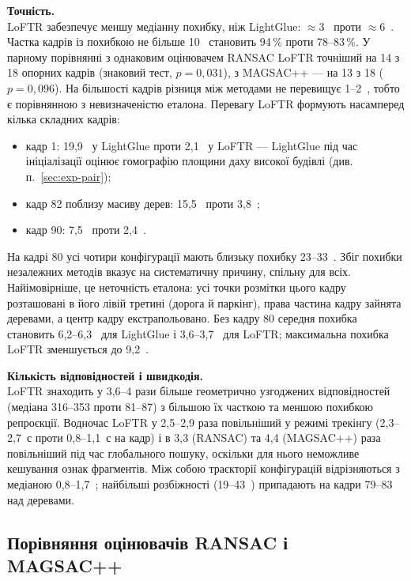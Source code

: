\documentclass[a4paper, 12pt, titlepage]{article}
\begin{document}
\textbf{Точність.}\\
LoFTR забезпечує меншу медіанну похибку, ніж LightGlue: $\approx 3$~\px{} проти $\approx 6$~\px{}. Частка кадрів із похибкою не більше 10~\px{} становить 94\,\% проти 78--83\,\%. У парному порівнянні з однаковим оцінювачем RANSAC LoFTR точніший на 14 з 18 опорних кадрів (знаковий тест, $p = 0{,}031$), з MAGSAC++ --- на 13 з 18 ($p = 0{,}096$). На більшості кадрів різниця між методами не перевищує 1--2~\px{}, тобто є порівнянною з невизначеністю еталона. Перевагу LoFTR формують насамперед кілька складних кадрів:
\begin{itemize}
    \item кадр 1: 19,9~\px{} у LightGlue проти 2,1~\px{} у LoFTR --- LightGlue під час ініціалізації оцінює гомографію площини даху високої будівлі (див. п.~\ref{sec:exp-pair});
    \item кадр 82 поблизу масиву дерев: 15,5~\px{} проти 3,8~\px{};
    \item кадр 90: 7,5~\px{} проти 2,4~\px{}.
\end{itemize}

На кадрі 80 усі чотири конфігурації мають близьку похибку 23--33~\px{}. Збіг похибки незалежних методів вказує на систематичну причину, спільну для всіх. Найімовірніше, це неточність еталона: усі точки розмітки цього кадру розташовані в його лівій третині (дорога й паркінг), права частина кадру зайнята деревами, а центр кадру екстрапольовано. Без кадру 80 середня похибка становить 6,2--6,3~\px{} для LightGlue і 3,6--3,7~\px{} для LoFTR; максимальна похибка LoFTR зменшується до 9,2~\px{}.

\textbf{Кількість відповідностей і швидкодія.}\\
LoFTR знаходить у 3,6--4 рази більше геометрично узгоджених відповідностей (медіана 316--353 проти 81--87) з більшою їх часткою та меншою похибкою репроєкції. Водночас LoFTR у 2,5--2,9 раза повільніший у режимі трекінгу (2,3--2,7~с проти 0,8--1,1~с на кадр) і в 3,3 (RANSAC) та 4,4 (MAGSAC++) раза повільніший під час глобального пошуку, оскільки для нього неможливе кешування ознак фрагментів. Між собою траєкторії конфігурацій відрізняються з медіаною 0,8--1,7~\px{}; найбільші розбіжності (19--43~\px{}) припадають на кадри 79--83 над деревами.

\subsection{Порівняння оцінювачів RANSAC і MAGSAC++}
\end{document}
